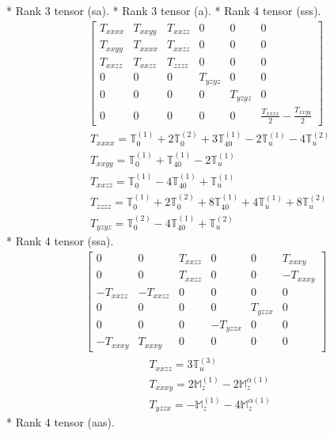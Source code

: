\documentclass[fleqn,8pt,landscape]{jsarticle}
\begin{document}
* Rank 3 tensor (sa).
* Rank 3 tensor (a).
* Rank 4 tensor (sss).
\begin{align*}
\begin{bmatrix} T_{xxxx} & T_{xxyy} & T_{xxzz} & 0 & 0 & 0 \\ T_{xxyy} & T_{xxxx} & T_{xxzz} & 0 & 0 & 0 \\ T_{xxzz} & T_{xxzz} & T_{zzzz} & 0 & 0 & 0 \\ 0 & 0 & 0 & T_{yzyz} & 0 & 0 \\ 0 & 0 & 0 & 0 & T_{yzyz} & 0 \\ 0 & 0 & 0 & 0 & 0 & \frac{T_{xxxx}}{2} - \frac{T_{xxyy}}{2} \end{bmatrix}
\end{align*}
\begin{align*}
& T_{xxxx} = \mathbb{T}_{0}^{(1)} + 2 \mathbb{T}_{0}^{(2)} + 3 \mathbb{T}_{40}^{(1)} - 2 \mathbb{T}_{u}^{(1)} - 4 \mathbb{T}_{u}^{(2)} \\
& T_{xxyy} = \mathbb{T}_{0}^{(1)} + \mathbb{T}_{40}^{(1)} - 2 \mathbb{T}_{u}^{(1)} \\
& T_{xxzz} = \mathbb{T}_{0}^{(1)} - 4 \mathbb{T}_{40}^{(1)} + \mathbb{T}_{u}^{(1)} \\
& T_{zzzz} = \mathbb{T}_{0}^{(1)} + 2 \mathbb{T}_{0}^{(2)} + 8 \mathbb{T}_{40}^{(1)} + 4 \mathbb{T}_{u}^{(1)} + 8 \mathbb{T}_{u}^{(2)} \\
& T_{yzyz} = \mathbb{T}_{0}^{(2)} - 4 \mathbb{T}_{40}^{(1)} + \mathbb{T}_{u}^{(2)}
\end{align*}
* Rank 4 tensor (ssa).
\begin{align*}
\begin{bmatrix} 0 & 0 & T_{xxzz} & 0 & 0 & T_{xxxy} \\ 0 & 0 & T_{xxzz} & 0 & 0 & - T_{xxxy} \\ - T_{xxzz} & - T_{xxzz} & 0 & 0 & 0 & 0 \\ 0 & 0 & 0 & 0 & T_{yzzx} & 0 \\ 0 & 0 & 0 & - T_{yzzx} & 0 & 0 \\ - T_{xxxy} & T_{xxxy} & 0 & 0 & 0 & 0 \end{bmatrix}
\end{align*}
\begin{align*}
& T_{xxzz} = 3 \mathbb{T}_{u}^{(3)} \\
& T_{xxxy} = 2 \mathbb{M}_{z}^{(1)} - 2 \mathbb{M}_{z}^{\alpha(1)} \\
& T_{yzzx} = - \mathbb{M}_{z}^{(1)} - 4 \mathbb{M}_{z}^{\alpha(1)}
\end{align*}
* Rank 4 tensor (aas).
\end{document}
